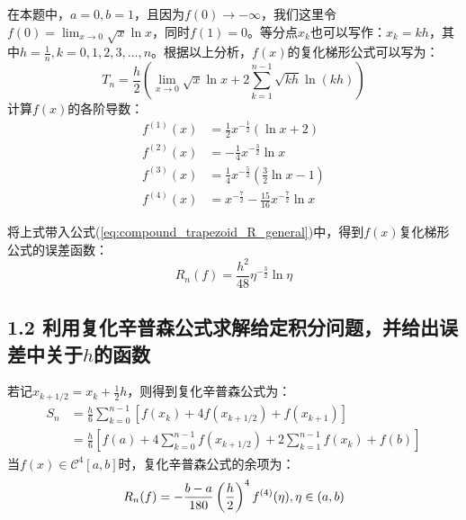 在本题中，$a=0,b=1$，且因为$f(0) \rightarrow -\infty$，我们这里令$f(0) = \lim_{x \rightarrow 0} \sqrt{x} \ln x$，同时$f(1) = 0$。等分点$x_k$也可以写作：$x_k = kh$，其中$h = \frac{1}{n},k=0,1,2,3,...,n$。根据以上分析，$f(x)$的复化梯形公式可以写为：
\begin{equation}
    T_n = \frac{h}{2} \left(\lim_{x\rightarrow 0} \sqrt{x} \ln x + 2 \sum_{k=1}^{n-1} \sqrt{kh} \ln(kh)\right)
    \label{eq:compound_trapezoid_f}
\end{equation}
计算$f(x)$的各阶导数：
\begin{equation}
    \begin{aligned}
        f^{(1)}(x) & = \frac{1}{2} x^{-\frac{1}{2}} (\ln x + 2) \\
        f^{(2)}(x) & = -\frac{1}{4} x^{-\frac{3}{2}} \ln x \\
        f^{(3)}(x) & = \frac{1}{4} x^{-\frac{5}{2}} (\frac{3}{2} \ln x -1) \\
        f^{(4)}(x) & = x^{-\frac{7}{2}} - \frac{15}{16} x^{-\frac{7}{2}} \ln x
    \end{aligned}
    \label{eq:f_diff}
\end{equation}

将上式带入公式(\ref{eq:compound_trapezoid_R_general})中，得到$f(x)$复化梯形公式的误差函数：
\begin{equation}
    R_n(f) = \frac{h^2}{48} \eta^{-\frac{3}{2}} \ln \eta
    \label{eq:compound_trapezoid_R_f}
\end{equation}

\subsection*{1.2 利用复化辛普森公式求解给定积分问题，并给出误差中关于$h$的函数}

若记$x_{k+1/2} = x_k + \frac{1}{2}h$，则得到复化辛普森公式为：
\begin{equation}
    \begin{aligned}
        S_n & = \frac{h}{6} \sum_{k=0}^{n-1} [f(x_k) + 4f(x_{k+1/2}) + f(x_{k+1})] \\
            & = \frac{h}{6} [f(a) + 4\sum_{k=0}^{n-1} f(x_{k+1/2}) + 2\sum_{k=1}^{n-1} f(x_{k}) + f(b)]
    \end{aligned}
    \label{eq:Simpson_general}
\end{equation}
当$f(x) \in \mathcal{C}^4[a,b]$时，复化辛普森公式的余项为：
\begin{equation}
    R_n(f) = - \frac{b-a}{180} \left(\frac{h}{2}\right)^4 f^{(4)}(\eta), \\ \eta \in (a,b)
    \label{eq:simpson_diff}
\end{equation}

